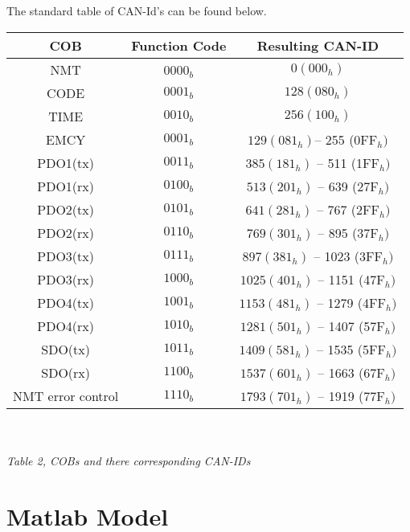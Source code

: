


The standard table of CAN-Id's can be found below.

\begin{tabular}{|c|c|c|}
	\hline 
	\textbf{COB} & \textbf{Function Code} & \textbf{Resulting CAN-ID} \\ 
	\hline 
	NMT &  0000$_{b}$  & $0 (000_{h})$  \\ 
	\hline 
	CODE & $0001_{b}$ &  $128 (080_{h})$\\ 
	\hline 
	TIME & $0010_{b}$ &  $256 (100_{h})$\\ 
	\hline 
	EMCY & $0001_{b}$ &   $129 (081_{h}) $–  255 (0FF$_{h})$ \\ 
	\hline 
	PDO1(tx) & $0011_{b}$ &  $385 (181_{h}) $ – 511 (1FF$_{h})$\\ 
	\hline 
	PDO1(rx) & $0100_{b}$ &  $513 (201_{h}) $ –  639 (27F$_{h})$\\ 
	\hline 
	PDO2(tx) & $0101_{b}$ &  $641 (281_{h}) $ –  767 (2FF$_{h})$\\ 
	\hline 
	PDO2(rx) & $0110_{b}$ &  $769 (301_{h})$  –  895 (37F$_{h})$\\ 
	\hline 
	PDO3(tx) & $0111_{b}$ &  $897 (381_{h}) $ – 1023 (3FF$_{h})$\\ 
	\hline 
	PDO3(rx) & $1000_{b}$ &  $1025 (401_{h}) $ –  1151 (47F$_{h})$\\ 
	\hline 
	PDO4(tx) & $1001_{b}$ &  $1153 (481_{h}) $ –  1279 (4FF$_{h})$\\ 
	\hline 
	PDO4(rx) & $1010_{b}$ & $1281 (501_{h}) $ –  1407 (57F$_{h})$\\ 
	\hline 
	SDO(tx) & $1011_{b}$ & $ 1409 (581_{h}) $ –  1535 (5FF$_{h})$\\ 
	\hline 
	SDO(rx) & $1100_{b}$ & $1537 (601_{h}) $ –  1663 (67F$_{h})$\\ 
	\hline 
	NMT error control &$ 1110_{b} $& $ 1793 (701_{h}) $ –  1919 (77F$_{h})$\\ 
	\hline 
\end{tabular} 
\\
\\
\textit{Table 2, COBs and there corresponding CAN-IDs}









\section{Matlab Model}

